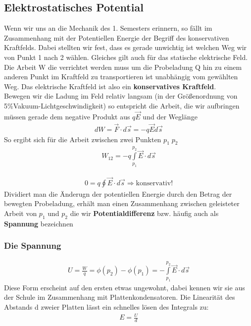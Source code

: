 \subsection{Elektrostatisches Potential}
Wenn wir uns an die Mechanik des 1. Semesters erinnern, so fällt im Zusammenhang mit der Potentiellen Energie der Begriff des konservativen Kraftfelds. Dabei stellten wir fest, dass es gerade unwichtig ist welchen Weg wir von Punkt 1 nach 2 wählen. Gleiches gilt auch für das statische elektrische Feld. Die Arbeit W die verrichtet werden muss um die Probeladung Q hin zu einem anderen Punkt im Kraftfeld zu transportieren ist unabhängig vom gewählten Weg. Das elektrische Kraftfeld ist also ein \textbf{konservatives Kraftfeld}. \\ Bewegen wir die Ladung im Feld relativ langsam (in der Größenordnung von 5\%Vakuum-Lichtgeschwindigkeit) so entspricht die Arbeit, die wir aufbringen müssen gerade dem negative Produkt aus $q \vec{E}$ und der Weglänge\begin{align}
dW = \vec{F} \cdot d\vec{s} = - q \vec{E} d\vec{s} \label{eqn:defElArbeit}
\end{align}
So ergibt sich für die Arbeit zwischen zwei Punkten $p_1 \; p_2$\begin{align}
\boxed{ W_{12}	= -q\int \limits_{p_1}^{p_2} \vec{ E} \cdot d\vec{s} }\label{eqn:elArbeit} \end{align}

\begin{align}
0 		= q \oint  \vec{E} \cdot d\vec{s} \Rightarrow \mathrm{konservativ!}
\end{align} Dividiert man die Änderugn der potentiellen Energie durch den Betrag der bewegten Probeladung, erhält man einen Zusammenhang zwischen geleisteter Arbeit von $p_1$ und $p_2$ die wir \textbf{Potentialdifferenz} bzw. häufig auch als \textbf{Spannung} bezeichnen

\subsubsection{Die Spannung}
\begin{align} \label{eqn:defSpannung}
\boxed{U = \frac{W}{q} = \phi\left( p_2\right) - \phi\left( p_1\right) = - \int \limits_{p_1}^{p_2} \vec{ E} \cdot d\vec{s} }
\end{align}Diese Form erscheint auf den ersten etwas ungewohnt, dabei kennen wir sie aus der Schule im Zusammenhang mit Plattenkondensatoren. Die Linearität des Abstands d zweier Platten lässt ein schnelles lösen des Integrals zu:\begin{align*}
E = \frac{U}{d}
\end{align*}
